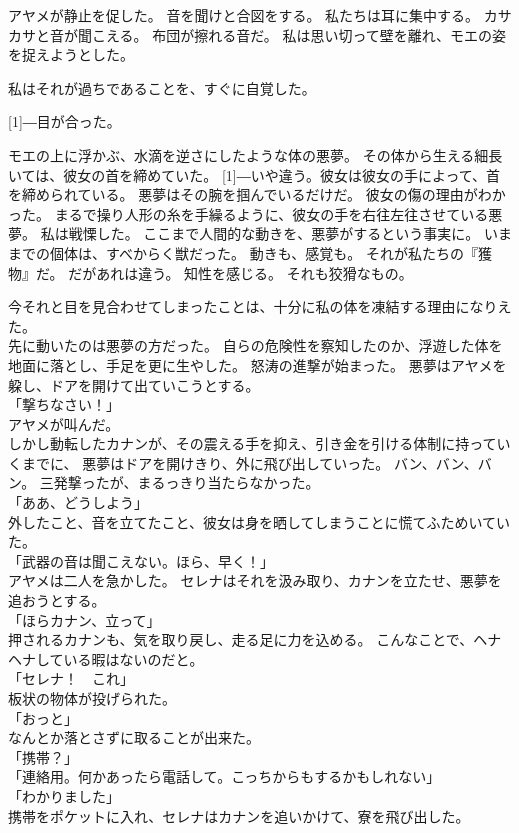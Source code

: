 \documentclass[../IHMain]{subfiles}
\begin{document}
アヤメが静止を促した。
音を聞けと合図をする。
私たちは耳に集中する。
カサカサと音が聞こえる。
布団が擦れる音だ。
私は思い切って壁を離れ、モエの姿を捉えようとした。

私はそれが過ちであることを、すぐに自覚した。

\scalebox{3}[1]{―}目が合った。

モエの上に浮かぶ、水滴を逆さにしたような体の悪夢。
その体から生える細長いては、彼女の首を締めていた。
\scalebox{3}[1]{―}いや違う。彼女は彼女の手によって、首を締められている。
悪夢はその腕を掴んでいるだけだ。
彼女の傷の理由がわかった。
まるで操り人形の糸を手繰るように、彼女の手を右往左往させている悪夢。
私は戦慄した。
ここまで人間的な動きを、悪夢がするという事実に。
いままでの個体は、すべからく獣だった。
動きも、感覚も。
それが私たちの『獲物』だ。
だがあれは違う。
知性を感じる。
それも狡猾なもの。

今それと目を見合わせてしまったことは、十分に私の体を凍結する理由になりえた。\\

先に動いたのは悪夢の方だった。
自らの危険性を察知したのか、浮遊した体を地面に落とし、手足を更に生やした。
怒涛の進撃が始まった。
悪夢はアヤメを躱し、ドアを開けて出ていこうとする。\\
「撃ちなさい！」\\
アヤメが叫んだ。\\
しかし動転したカナンが、その震える手を抑え、引き金を引ける体制に持っていくまでに、
悪夢はドアを開けきり、外に飛び出していった。
バン、バン、バン。
三発撃ったが、まるっきり当たらなかった。\\
「ああ、どうしよう」\\
外したこと、音を立てたこと、彼女は身を晒してしまうことに慌てふためいていた。\\
「武器の音は聞こえない。ほら、早く！」\\
アヤメは二人を急かした。
セレナはそれを汲み取り、カナンを立たせ、悪夢を追おうとする。\\
「ほらカナン、立って」\\
押されるカナンも、気を取り戻し、走る足に力を込める。
こんなことで、ヘナヘナしている暇はないのだと。\\
「セレナ！　これ」\\
板状の物体が投げられた。\\
「おっと」\\
なんとか落とさずに取ることが出来た。\\
「携帯？」\\
「連絡用。何かあったら電話して。こっちからもするかもしれない」\\
「わかりました」\\
携帯をポケットに入れ、セレナはカナンを追いかけて、寮を飛び出した。
\end{document}
